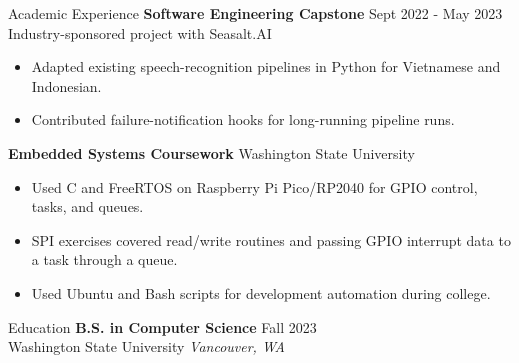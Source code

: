 \begin{rSection}{Academic Experience}
\textbf{Software Engineering Capstone} \hfill Sept 2022 - May 2023 \\
Industry-sponsored project with Seasalt.AI
\begin{itemize}\itemsep -3pt
\item Adapted existing speech-recognition pipelines in Python for Vietnamese and Indonesian.
\item Contributed failure-notification hooks for long-running pipeline runs.
\end{itemize}

\textbf{Embedded Systems Coursework} \hfill Washington State University
\begin{itemize}\itemsep -3pt
\item Used C and FreeRTOS on Raspberry Pi Pico/RP2040 for GPIO control, tasks, and queues.
\item SPI exercises covered read/write routines and passing GPIO interrupt data to a task through a queue.
\item Used Ubuntu and Bash scripts for development automation during college.
\end{itemize}
\end{rSection}

\begin{rSection}{Education}
\textbf{B.S. in Computer Science} \hfill Fall 2023 \\
Washington State University \hfill \textit{Vancouver, WA}
\end{rSection}
